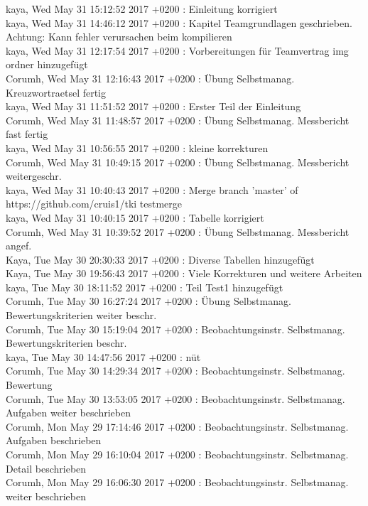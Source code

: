 kaya, Wed May 31 15:12:52 2017 +0200 : Einleitung korrigiert\\
kaya, Wed May 31 14:46:12 2017 +0200 : Kapitel Teamgrundlagen geschrieben. Achtung: Kann fehler verursachen beim kompilieren\\
kaya, Wed May 31 12:17:54 2017 +0200 : Vorbereitungen für Teamvertrag img ordner hinzugefügt\\
Corumh, Wed May 31 12:16:43 2017 +0200 : Übung Selbstmanag. Kreuzwortraetsel fertig\\
kaya, Wed May 31 11:51:52 2017 +0200 : Erster Teil der Einleitung\\
Corumh, Wed May 31 11:48:57 2017 +0200 : Übung Selbstmanag. Messbericht fast fertig\\
kaya, Wed May 31 10:56:55 2017 +0200 : kleine korrekturen\\
Corumh, Wed May 31 10:49:15 2017 +0200 : Übung Selbstmanag. Messbericht weitergeschr.\\
kaya, Wed May 31 10:40:43 2017 +0200 : Merge branch 'master' of https://github.com/cruis1/tki testmerge\\
kaya, Wed May 31 10:40:15 2017 +0200 : Tabelle korrigiert\\
Corumh, Wed May 31 10:39:52 2017 +0200 : Übung Selbstmanag. Messbericht angef.\\
Kaya, Tue May 30 20:30:33 2017 +0200 : Diverse Tabellen hinzugefügt\\
Kaya, Tue May 30 19:56:43 2017 +0200 : Viele Korrekturen und weitere Arbeiten\\
kaya, Tue May 30 18:11:52 2017 +0200 : Teil Test1 hinzugefügt\\
Corumh, Tue May 30 16:27:24 2017 +0200 : Übung Selbstmanag. Bewertungskriterien weiter beschr.\\
Corumh, Tue May 30 15:19:04 2017 +0200 : Beobachtungsinstr. Selbstmanag. Bewertungskriterien beschr.\\
kaya, Tue May 30 14:47:56 2017 +0200 : nüt\\
Corumh, Tue May 30 14:29:34 2017 +0200 : Beobachtungsinstr. Selbstmanag. Bewertung\\
Corumh, Tue May 30 13:53:05 2017 +0200 : Beobachtungsinstr. Selbstmanag. Aufgaben weiter beschrieben\\
Corumh, Mon May 29 17:14:46 2017 +0200 : Beobachtungsinstr. Selbstmanag. Aufgaben beschrieben\\
Corumh, Mon May 29 16:10:04 2017 +0200 : Beobachtungsinstr. Selbstmanag. Detail beschrieben\\
Corumh, Mon May 29 16:06:30 2017 +0200 : Beobachtungsinstr. Selbstmanag. weiter beschrieben\\
